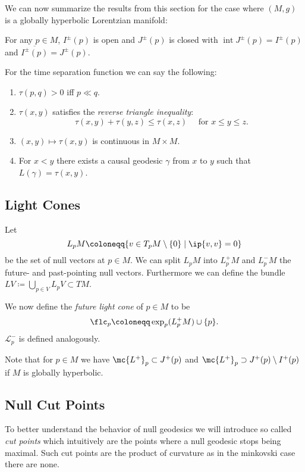 \begin{remark}\label{rmk:causalitysummary}
We can now summarize the results from this section for the case where $(M,g)$ is a globally hyperbolic Lorentzian manifold:

For any $p\in M$, $I^\pm(p)$ is open and $J^\pm(p)$ is closed with $\operatorname{int} J^\pm(p) = I^\pm(p)$ and $\overline{I^\pm(p)}=J^\pm(p)$.

For the time separation function we can say the following:
\begin{enumerate}[label={\textnormal{(\arabic*)}}]
    \item $\tau(p,q)>0$ iff $p\ll q$.
    \item $\tau(x,y)$ satisfies the \emph{reverse triangle inequality}:
    \[
    \tau(x,y) + \tau(y,z) \leq \tau(x,z) \quad \text{ for }x\leq y\leq z.
    \]
    \item $(x,y)\mapsto \tau(x,y)$ is continuous in $M\times M$.
    \item For $x<y$ there exists a causal geodesic $\gamma$ from $x$ to $y$ such that $L(\gamma)=\tau(x,y)$.
\end{enumerate}

\end{remark}


\subsection{Light Cones}


\begin{definition}
Let 
\[
L_pM \coloneqq \{ v\in T_pM\setminus\{0\} \mid \ip{v,v}=0 \}
\]
be the set of null vectors at $p\in M$. We can split $L_pM$ into $L^+_pM$ and $L^-_pM$ the future- and past-pointing null vectors. Furthermore we can define the bundle $LV\coloneqq\bigcup_{p\in V}L_pV\subset TM$.

We now define the \emph{future light cone} of $p\in M$ to be 
\[
\flc_p \coloneqq \exp_p(L^+_pM) \cup \{p\}.
\]
$\mathcal{L}^-_p$ is defined analogously.
\end{definition}
Note that for $p\in M$ we have $\mc{L^+}_p\subset J^+(p)$ and $\mc{L^+}_p\supset J^+(p)\setminus I^+(p)$ if $M$ is globally hyperbolic.



\subsection{Null Cut Points}
To better understand the behavior of null geodesics we will introduce so called \emph{cut points} which intuitively are the points where a null geodesic stops being maximal. Such cut points are the product of curvature as in the minkovski case there are none.

